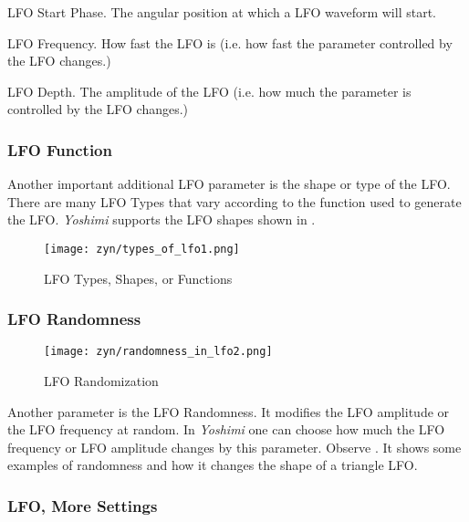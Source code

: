    LFO Start Phase.
   The angular position at which a LFO waveform will start.

   LFO Frequency.
   How fast the LFO is (i.e. how fast the parameter controlled by
   the LFO changes.)

   LFO Depth.
   The amplitude of the LFO (i.e. how much the parameter is controlled by
   the LFO changes.)

\subsubsection{LFO Function}
\label{subsubsec:lfo_function}

   Another important additional LFO parameter is the shape or type of the
   LFO. There are many LFO Types that vary according to the function used to
   generate the LFO. \textsl{Yoshimi} supports the LFO shapes shown in
   .

\begin{figure}[H]
   \centering
   \texttt{[image: zyn/types\_of\_lfo1.png]}
   \caption[LFO Functions]{LFO Types, Shapes, or Functions}
   \label{fig:types_of_lfo}
\end{figure}

\subsubsection{LFO Randomness}
\label{subsubsec:lfo_randomness}

\begin{figure}[H]
   \centering
   \texttt{[image: zyn/randomness\_in\_lfo2.png]}
   \caption[LFO Randomization]{LFO Randomization}
   \label{fig:randomness_in_lfo}
\end{figure}

   Another parameter is the LFO Randomness. It modifies the LFO amplitude or
   the LFO frequency at random. In \textsl{Yoshimi}
   one can choose how much the LFO
   frequency or LFO amplitude changes by this parameter.
   Observe .
   It shows some examples of randomness and how it changes the shape of a
   triangle LFO.

\subsubsection{LFO, More Settings}
\label{subsubsec:lfo_more_settings}

